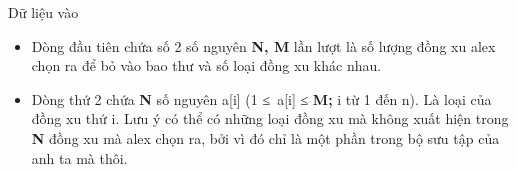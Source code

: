Dữ liệu vào
\begin{itemize}
	\item     Dòng đầu tiên chứa số 2 số nguyên    \textbf{     N, M    }    lần lượt là số lượng đồng xu    alex    chọn ra để bỏ vào bao thư và số loại đồng xu khác nhau.   
	\item     Dòng thứ 2 chứa    \textbf{     N    }    số nguyên a[i] (1 ≤ a[i] ≤    \textbf{     M;    }    i từ 1 đến n). Là loại của đồng xu thứ i. Lưu ý có thể có những loại đồng xu mà không xuất hiện trong    \textbf{     N    }    đồng xu mà    alex    chọn ra, bởi vì đó chỉ là một phần trong bộ sưu tập của anh ta mà thôi.   
\end{itemize}